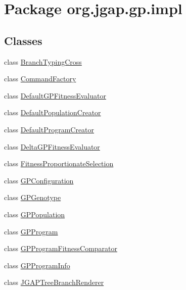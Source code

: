 \hypertarget{namespaceorg_1_1jgap_1_1gp_1_1impl}{\section{Package org.\-jgap.\-gp.\-impl}
\label{namespaceorg_1_1jgap_1_1gp_1_1impl}
}
\subsection*{Classes}
\begin{DoxyCompactItemize}
\item 
class \hyperlink{classorg_1_1jgap_1_1gp_1_1impl_1_1_branch_typing_cross}{Branch\-Typing\-Cross}
\item 
class \hyperlink{classorg_1_1jgap_1_1gp_1_1impl_1_1_command_factory}{Command\-Factory}
\item 
class \hyperlink{classorg_1_1jgap_1_1gp_1_1impl_1_1_default_g_p_fitness_evaluator}{Default\-G\-P\-Fitness\-Evaluator}
\item 
class \hyperlink{classorg_1_1jgap_1_1gp_1_1impl_1_1_default_population_creator}{Default\-Population\-Creator}
\item 
class \hyperlink{classorg_1_1jgap_1_1gp_1_1impl_1_1_default_program_creator}{Default\-Program\-Creator}
\item 
class \hyperlink{classorg_1_1jgap_1_1gp_1_1impl_1_1_delta_g_p_fitness_evaluator}{Delta\-G\-P\-Fitness\-Evaluator}
\item 
class \hyperlink{classorg_1_1jgap_1_1gp_1_1impl_1_1_fitness_proportionate_selection}{Fitness\-Proportionate\-Selection}
\item 
class \hyperlink{classorg_1_1jgap_1_1gp_1_1impl_1_1_g_p_configuration}{G\-P\-Configuration}
\item 
class \hyperlink{classorg_1_1jgap_1_1gp_1_1impl_1_1_g_p_genotype}{G\-P\-Genotype}
\item 
class \hyperlink{classorg_1_1jgap_1_1gp_1_1impl_1_1_g_p_population}{G\-P\-Population}
\item 
class \hyperlink{classorg_1_1jgap_1_1gp_1_1impl_1_1_g_p_program}{G\-P\-Program}
\item 
class \hyperlink{classorg_1_1jgap_1_1gp_1_1impl_1_1_g_p_program_fitness_comparator}{G\-P\-Program\-Fitness\-Comparator}
\item 
class \hyperlink{classorg_1_1jgap_1_1gp_1_1impl_1_1_g_p_program_info}{G\-P\-Program\-Info}
\item 
class \hyperlink{classorg_1_1jgap_1_1gp_1_1impl_1_1_j_g_a_p_tree_branch_renderer}{J\-G\-A\-P\-Tree\-Branch\-Renderer}

\end{DoxyCompactItemize}
